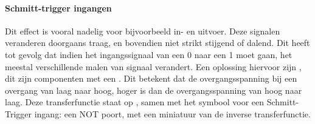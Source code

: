\paragraph{Schmitt-trigger ingangen} Dit effect is vooral nadelig voor bijvoorbeeld in- en uitvoer. Deze signalen veranderen doorgaans traag, en bovendien niet strikt stijgend of dalend. Dit heeft tot gevolg dat indien het ingangssignaal van een 0 naar een 1 moet gaan, het meestal verschillende malen van signaal verandert. Een oplossing hiervoor zijn , dit zijn componenten met een . Dit betekent dat de overgangsspanning bij een overgang van laag naar hoog, hoger is dan de overgangsspanning van hoog naar laag. Deze transferfunctie staat op , samen met het symbool voor een Schmitt-Trigger ingang: een NOT poort, met een miniatuur van de inverse transferfunctie.
